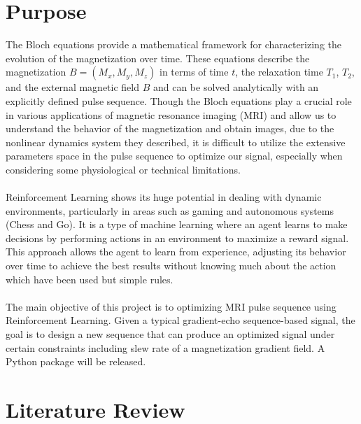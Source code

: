 \section{Purpose}
The Bloch equations provide a mathematical framework for characterizing the evolution of the magnetization over time. These equations describe the magnetization $B=(M_x, M_y, M_z)$ in terms of time $t$, the relaxation time $T_1$, $T_2$, and the external magnetic field $B$ and can be solved analytically with an explicitly defined pulse sequence. Though the Bloch equations play a crucial role in various applications of magnetic resonance imaging (MRI) and allow us to understand the behavior of the magnetization and obtain images, due to the nonlinear dynamics system they described, it is difficult to utilize the extensive parameters space in the pulse sequence to optimize our signal, especially when considering some physiological or technical limitations.
\\\\
Reinforcement Learning shows its huge potential in dealing with dynamic environments, particularly in areas such as gaming and autonomous systems (Chess and Go). It is a type of machine learning where an agent learns to make decisions by performing actions in an environment to maximize a reward signal. This approach allows the agent to learn from experience, adjusting its behavior over time to achieve the best results without knowing much about the action which have been used but simple rules.
\\\\
The main objective of this project is to optimizing MRI pulse sequence using Reinforcement Learning. Given a typical gradient-echo sequence-based signal, the goal is to design a new sequence that can produce an optimized signal under certain constraints including slew rate of a magnetization gradient field. A Python package will be released.

\section{Literature Review}

